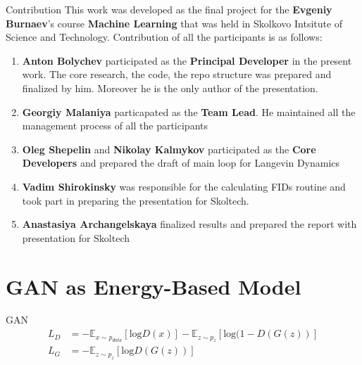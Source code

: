 \documentclass[xcolor=dvipsnames]{beamer}
\begin{document}
    \begin{frame}
        \titlepage
    \end{frame}
    \begin{frame}{Contribution}
        This work was developed as the final project for the \textbf{Evgeniy Burnaev}'s course  
        \textbf{Machine Learning} that was held in Skolkovo Intsitute of Science and Technology.
        Contribution of all the participants is as follows:
        \begin{enumerate}
            \item \textbf{Anton Bolychev} participated as the \textbf{Principal Developer} in the present work. The core
            research, the code, the repo structure was prepared and finalized by him. Moreover he is the only 
            author of the presentation.
            \item \textbf{Georgiy Malaniya} particapated as the \textbf{Team Lead}. He maintained all the management
            process of all the participants
            \item \textbf{Oleg Shepelin} and \textbf{Nikolay Kalmykov} participated as 
            the \textbf{Core Developers} and prepared the draft of main loop for Langevin Dynamics
            \item \textbf{Vadim Shirokinsky} was responsible for the calculating FIDs routine and took part in preparing
            the presentation for Skoltech.
            \item \textbf{Anastasiya Archangelskaya} finalized results and prepared the report with presentation for
            Skoltech
        \end{enumerate}
    \end{frame}
    \section{GAN as Energy-Based Model}
    \label{sec:energy-gan} 
    \begin{frame}{GAN}
        \begin{align*}
            L_D &= -\mathbb{E}_{x \sim p_{data}} [ \text{log} D(x)] - \mathbb{E}_{z \sim p_z} [\text{log}(1 - D(G(z))] \\    
            L_G &= -\mathbb{E}_{z \sim p_z} [\text{log} D(G(z))]
        \end{align*}
    \end{frame}
    
\end{document}
